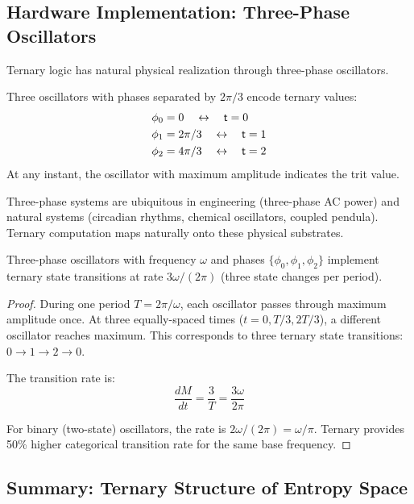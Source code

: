 \subsection{Hardware Implementation: Three-Phase Oscillators}

Ternary logic has natural physical realization through three-phase oscillators.

\begin{definition}
\label{def:three_phase}
Three oscillators with phases separated by $2\pi/3$ encode ternary values:
\begin{align}
\phi_0 &= 0 \quad \leftrightarrow \quad \mathsf{t} = 0 \\
\phi_1 &= 2\pi/3 \quad \leftrightarrow \quad \mathsf{t} = 1 \\
\phi_2 &= 4\pi/3 \quad \leftrightarrow \quad \mathsf{t} = 2
\end{align}
At any instant, the oscillator with maximum amplitude indicates the trit value.
\end{definition}

Three-phase systems are ubiquitous in engineering (three-phase AC power) and natural systems (circadian rhythms, chemical oscillators, coupled pendula). Ternary computation maps naturally onto these physical substrates.

\begin{proposition}
\label{prop:phase_trit}
Three-phase oscillators with frequency $\omega$ and phases $\{\phi_0, \phi_1, \phi_2\}$ implement ternary state transitions at rate $3\omega/(2\pi)$ (three state changes per period).
\end{proposition}

\begin{proof}
During one period $T = 2\pi/\omega$, each oscillator passes through maximum amplitude once. At three equally-spaced times ($t = 0, T/3, 2T/3$), a different oscillator reaches maximum. This corresponds to three ternary state transitions: $0 \to 1 \to 2 \to 0$.

The transition rate is:
\begin{equation}
\frac{dM}{dt} = \frac{3}{T} = \frac{3\omega}{2\pi}
\end{equation}

For binary (two-state) oscillators, the rate is $2\omega/(2\pi) = \omega/\pi$. Ternary provides 50\% higher categorical transition rate for the same base frequency.
\end{proof}

\subsection{Summary: Ternary Structure of Entropy Space}

